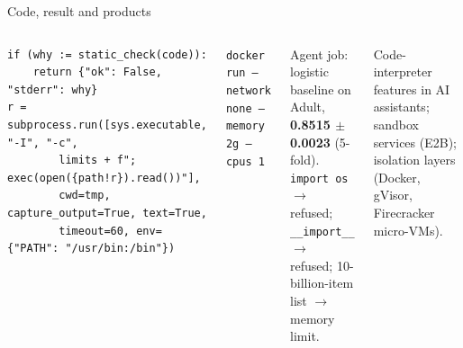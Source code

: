 \documentclass[aspectratio=169,11pt]{beamer}
\begin{document}
\begin{frame}[fragile]{Code, result and products}
\begin{columns}[T]
\begin{bcode}
\begin{lstlisting}
if (why := static_check(code)):
    return {"ok": False, "stderr": why}
r = subprocess.run([sys.executable, "-I", "-c",
        limits + f"; exec(open({path!r}).read())"],
        cwd=tmp, capture_output=True, text=True,
        timeout=60, env={"PATH": "/usr/bin:/bin"})
\end{lstlisting}
\end{bcode}
\begin{bdef}[Production]
\texttt{docker run --network none --memory 2g --cpus 1}
\end{bdef}
\begin{bres}
Agent job: logistic baseline on Adult, \textbf{0.8515 $\pm$ 0.0023} (5-fold).\\
\texttt{import os} $\rightarrow$ refused; \texttt{\_\_import\_\_} $\rightarrow$ refused; 10-billion-item list $\rightarrow$ memory limit.
\end{bres}
\begin{bapp}
Code-interpreter features in AI assistants; sandbox services (E2B); isolation layers (Docker, gVisor, Firecracker micro-VMs).
\end{bapp}
\end{columns}
\end{frame}

\end{document}
